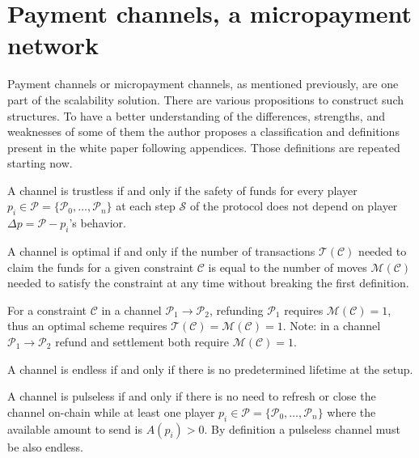 \chapter{Payment channels, a micropayment network}
\label{chap:paymentChannels}

Payment channels or micropayment channels, as mentioned previously, are one part
of the scalability solution. There are various propositions to construct
such structures. To have a better understanding of the differences, strengths, and
weaknesses of some of them the author proposes a classification and definitions present
in the white paper following appendices. Those definitions are repeated starting
now.

\begin{definition}[Trustless]
  A channel is trustless if and only if the safety of funds for every player
  $p_i \in \mathcal{P} = \{\mathcal{P}_0, \dots, \mathcal{P}_n\}$
  at each step $\mathcal{S}$ of the protocol does not depend on
  player $\Delta p = \mathcal{P} - p_i$'s behavior.
\end{definition}

\begin{definition}[Optimal]
  A channel is optimal if and only if the number of transactions $\mathcal{T}(\mathcal{C})$
  needed to claim the funds for a given constraint $\mathcal{C}$ is equal to
  the number of moves $\mathcal{M}(\mathcal{C})$ needed to satisfy the constraint
  at any time without breaking the first definition.

  For a constraint $\mathcal{C}$ in a channel $\mathcal{P}_1 \rightarrow \mathcal{P}_2$,
  refunding $\mathcal{P}_1$ requires $\mathcal{M}(\mathcal{C}) = 1$, thus
  an optimal scheme requires $\mathcal{T}(\mathcal{C}) = \mathcal{M}(\mathcal{C}) = 1$.
  Note: in a channel $\mathcal{P}_1 \rightarrow \mathcal{P}_2$ refund and settlement both
  require $\mathcal{M}(\mathcal{C}) = 1$.
\end{definition}

\begin{definition}[Endless]
  A channel is endless if and only if there is no predetermined lifetime at the setup.
\end{definition}

\begin{definition}[Pulseless]
  A channel is pulseless if and only if there is no need to refresh or close the
  channel on-chain while at least one player $p_i \in \mathcal{P} = \{\mathcal{P}_0,
  \dots, \mathcal{P}_n\}$ where the available amount to send is $A(p_i) > 0$. By
  definition a pulseless channel must be also endless.
\end{definition}

